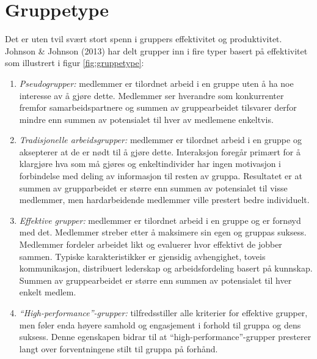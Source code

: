 \section{Gruppetype}
\label{sec:gruppetype}
Det er uten tvil svært stort spenn i gruppers effektivitet og produktivitet. Johnson \& Johnson (2013) har delt grupper inn i fire typer basert på effektivitet som illustrert i figur \ref{fig:gruppetype}:
\begin{enumerate}
\item \textit{Pseudogrupper:} medlemmer er tilordnet arbeid i en gruppe uten å ha noe interesse av å gjøre dette. Medlemmer ser hverandre som konkurrenter fremfor samarbeidspartnere og summen av gruppearbeidet tilsvarer derfor mindre enn summen av potensialet til hver av medlemene enkeltvis. \citep{gruppeteori}
\item \textit{Tradisjonelle arbeidsgrupper:} medlemmer er tilordnet arbeid i en gruppe og aksepterer at de er nødt til å gjøre dette. Interaksjon foregår primært for å klargjøre hva som må gjøres og enkeltindivider har ingen motivasjon i forbindelse med deling av informasjon til resten av gruppa. Resultatet er at summen av grupparbeidet er større enn summen av potensialet til visse medlemmer, men hardarbeidende medlemmer ville prestert bedre individuelt. \citep{gruppeteori}

\item \textit{Effektive grupper:} medlemmer er tilordnet arbeid i en gruppe og er fornøyd med det. Medlemmer streber etter å maksimere sin egen og gruppas suksess. Medlemmer fordeler arbeidet likt og evaluerer hvor effektivt de jobber sammen. Typiske karakteristikker er gjensidig avhengighet, toveis kommunikasjon, distribuert lederskap og arbeidsfordeling basert på kunnskap. Summen av gruppearbeidet er større enn summen av potensialet til hver enkelt medlem. \citep{gruppeteori}

\item \textit{``High-performance''-grupper:} tilfredsstiller alle kriterier for effektive grupper, men føler enda høyere samhold og engasjement i forhold til gruppa og dens suksess. Denne egenskapen bidrar til at ``high-performance''-grupper presterer langt over forventningene stilt til gruppa på forhånd. \citep{gruppeteori}


\end{enumerate}
